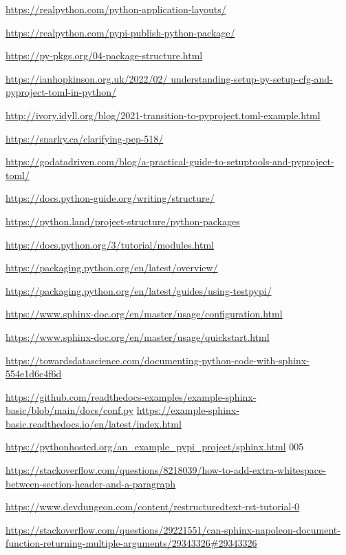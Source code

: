 \url{https://realpython.com/python-application-layouts/}

\url{https://realpython.com/pypi-publish-python-package/}

\url{https://py-pkgs.org/04-package-structure.html}

\url{https://ianhopkinson.org.uk/2022/02/
	understanding-setup-py-setup-cfg-and-pyproject-toml-in-python/}

\url{http://ivory.idyll.org/blog/2021-transition-to-pyproject.toml-example.html}

\url{https://snarky.ca/clarifying-pep-518/}

\url{https://godatadriven.com/blog/a-practical-guide-to-setuptools-and-pyproject-toml/}

\url{https://docs.python-guide.org/writing/structure/}

\url{https://python.land/project-structure/python-packages}

\url{https://docs.python.org/3/tutorial/modules.html}

\url{https://packaging.python.org/en/latest/overview/}

\url{https://packaging.python.org/en/latest/guides/using-testpypi/}

\url{https://www.sphinx-doc.org/en/master/usage/configuration.html}

\url{https://www.sphinx-doc.org/en/master/usage/quickstart.html}

\url{https://towardsdatascience.com/documenting-python-code-with-sphinx-554e1d6c4f6d}

\url{https://github.com/readthedocs-examples/example-sphinx-basic/blob/main/docs/conf.py}
\url{https://example-sphinx-basic.readthedocs.io/en/latest/index.html}

\url{https://pythonhosted.org/an_example_pypi_project/sphinx.html} 005

\url{https://stackoverflow.com/questions/8218039/how-to-add-extra-whitespace-between-section-header-and-a-paragraph}

\url{https://www.devdungeon.com/content/restructuredtext-rst-tutorial-0}

\url{https://stackoverflow.com/questions/29221551/can-sphinx-napoleon-document-function-returning-multiple-arguments/29343326#29343326}

\newpage

